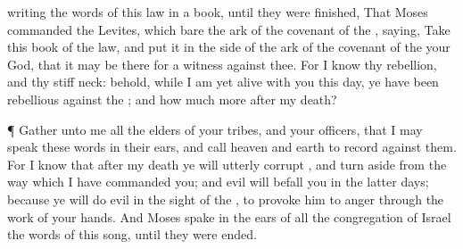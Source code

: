 {writing the
words of this
law in a
book, until they were
finished,
That
Moses
commanded the
Levites, which
bare the
ark of the
covenant of the
{},
saying,
Take this
book of the
law, and
put it in the
side of the
ark of the
covenant of the
{} your
God, that it may be there for a
witness against thee.
For I
know thy
rebellion, and thy
stiff
neck: behold, while I am yet
alive with you this
day, ye have been
rebellious against the
{}; and how much more
after my
death?
\par }{\PP {}¶
Gather unto me all the
elders of your
tribes, and your
officers, that I may
speak these
words in their
ears, and
call
heaven and
earth to
record against them.
For I
know that
after my
death ye will
utterly
corrupt
{}, and turn
aside from the
way which I have
commanded you; and
evil will
befall you in the
latter
days; because ye will
do
evil in the
sight of the
{}, to provoke him to
anger through the
work of your
hands.
And
Moses
spake in the
ears of all the
congregation of
Israel the
words of this
song, until they were
ended.

}
